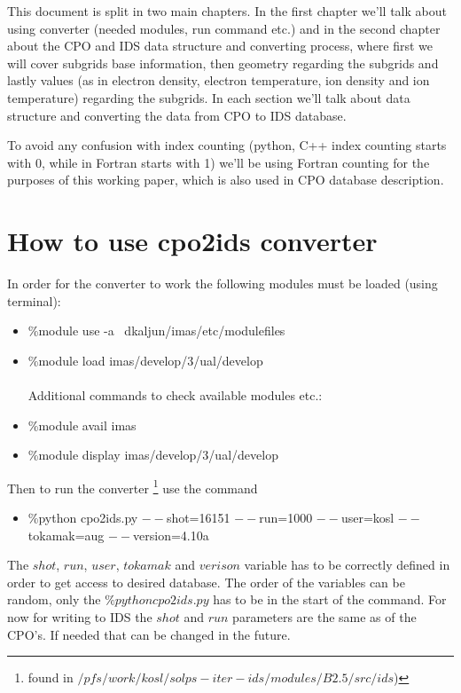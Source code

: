 \documentclass[a4paper,12pt,twoside]{article}
\begin{document}
This document is split in two main chapters. In the first chapter we'll talk about using converter (needed modules, run command etc.) and in the second chapter about the CPO and IDS data structure and converting process, where first we will cover subgrids base information, then geometry regarding the subgrids and lastly values (as in electron density, electron temperature, ion density and ion temperature) regarding the subgrids. In each section we'll talk about data structure and converting the data from CPO to IDS database.

To avoid any confusion with index counting (python, C++ index counting starts with 0, while in Fortran starts with 1) we'll be using Fortran counting for the purposes of this working paper, which is also used in CPO database description.


\clearpage
\section{How to use cpo2ids converter}

In order for the converter to work the following modules must be loaded (using terminal):

\begin{itemize}
\item[] \%module use -a ~dkaljun/imas/etc/modulefiles
\item[] \%module load imas/develop/3/ual/develop\\ \\
Additional commands to check available modules etc.:
\item[] \%module avail imas
\item[] \%module display imas/develop/3/ual/develop
\end{itemize}

Then to run the converter \footnote[1]{found in $/pfs/work/kosl/solps-iter-ids/modules/B2.5/src/ids$)} use the command

\begin{itemize}
\item[] \%python cpo2ids.py $--$shot=16151 $--$run=1000 $--$user=kosl $--$tokamak=aug $--$version=4.10a
\end{itemize}

The $shot$, $run$, $user$, $tokamak$ and $verison$ variable has to be correctly defined in order to get access to desired database. The order of the variables can be random, only the $\%python cpo2ids.py$ has to be in the start of the command.
For now for writing to IDS the $shot$ and $run$ parameters are the same as of the CPO's. If needed that can be changed in the future.
\end{document}

